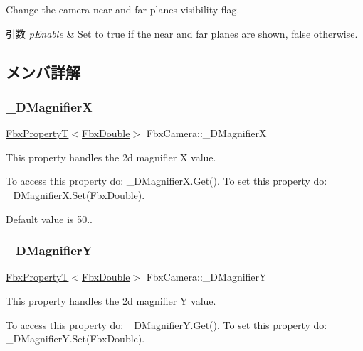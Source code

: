 Change the camera near and far planes visibility flag. 
\begin{DoxyParams}{引数}
{\em p\+Enable} & Set to {\ttfamily true} if the near and far planes are shown, {\ttfamily false} otherwise. \\
\hline
\end{DoxyParams}


\subsection{メンバ詳解}
\mbox{\label{class_fbx_camera_a0f5b732aa294c182fe6ac07ae70024fc}} 
\subsubsection{\texorpdfstring{\+\_\+D\+MagnifierX}{\_2DMagnifierX}}
{\footnotesize\ttfamily \hyperlink{class_fbx_property_t}{Fbx\+PropertyT}$<$\hyperlink{fbxtypes_8h_a171e72a1c46fc15c1a6c9c31948c1c5b}{Fbx\+Double}$>$ Fbx\+Camera\+::\+\_\+D\+MagnifierX}

This property handles the 2d magnifier X value.

To access this property do\+: \+\_\+D\+Magnifier\+X.\+Get(). To set this property do\+: \+\_\+D\+Magnifier\+X.\+Set(\+Fbx\+Double).

Default value is 50.. \mbox{\label{class_fbx_camera_a162fa10866f3c4cf3c5a87ed64aef21e}} 
\subsubsection{\texorpdfstring{\+\_\+D\+MagnifierY}{\_2DMagnifierY}}
{\footnotesize\ttfamily \hyperlink{class_fbx_property_t}{Fbx\+PropertyT}$<$\hyperlink{fbxtypes_8h_a171e72a1c46fc15c1a6c9c31948c1c5b}{Fbx\+Double}$>$ Fbx\+Camera\+::\+\_\+D\+MagnifierY}

This property handles the 2d magnifier Y value.

To access this property do\+: \+\_\+D\+Magnifier\+Y.\+Get(). To set this property do\+: \+\_\+D\+Magnifier\+Y.\+Set(\+Fbx\+Double).

